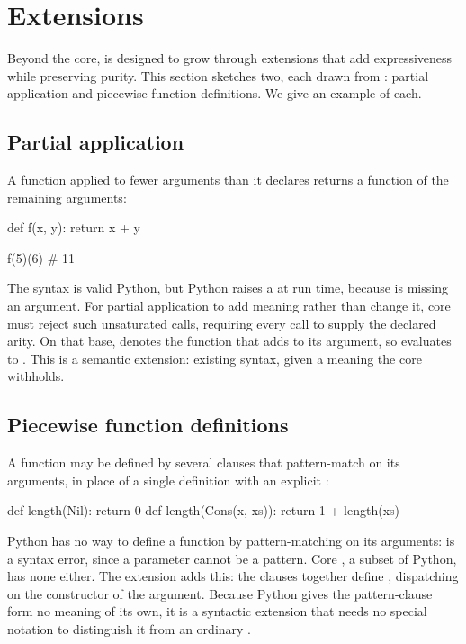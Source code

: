\section{Extensions}
\label{sec:extensions}

Beyond the core, \PurePy is designed to grow through extensions that add expressiveness while preserving
purity. This section sketches two, each drawn from \Fluid: partial application and piecewise function
definitions. We give an example of each. 

\subsection{Partial application}
\label{sec:ext-partial}

A function applied to fewer arguments than it declares returns a function of the remaining arguments:

\begin{python}
def f(x, y):
    return x + y

f(5)(6)  # 11
\end{python}

\noindent The syntax is valid Python, but Python raises a  at run time, because
 is missing an argument. For partial application to add meaning rather than change it, core
\PurePy must reject such unsaturated calls, requiring every call to supply the declared arity. On that base,
 denotes the function that adds  to its argument, so  evaluates to
. This is a semantic extension: existing syntax, given a meaning the core withholds.

\subsection{Piecewise function definitions}
\label{sec:ext-piecewise}

A function may be defined by several clauses that pattern-match on its arguments, in place of a single
definition with an explicit :

\begin{python}
def length(Nil):
    return 0
def length(Cons(x, xs)):
    return 1 + length(xs)
\end{python}

\noindent Python has no way to define a function by pattern-matching on its arguments:  is a syntax error, since a parameter cannot be a pattern. Core \PurePy, a subset of
Python, has none either. The extension adds this: the clauses together define , dispatching on
the constructor of the argument. Because Python gives the pattern-clause form no meaning of its own, it is a
syntactic extension that needs no special notation to distinguish it from an ordinary .

